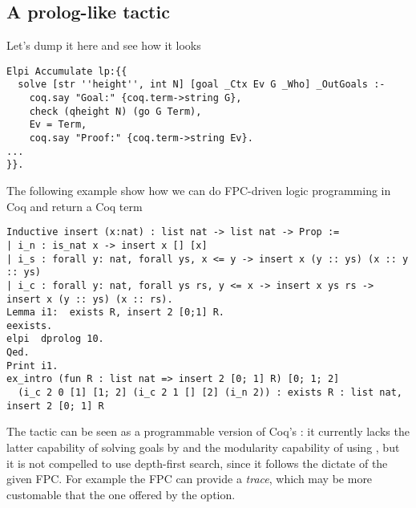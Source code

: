 

\subsection{A prolog-like tactic}

\begin{metanote}
  Let's dump it here and see how it looks
\end{metanote}

\begin{lstlisting}
Elpi Accumulate lp:{{
  solve [str ''height'', int N] [goal _Ctx Ev G _Who] _OutGoals :-
    coq.say "Goal:" {coq.term->string G},
    check (qheight N) (go G Term),
    Ev = Term,
    coq.say "Proof:" {coq.term->string Ev}.
...
}}.
\end{lstlisting}
The following example show how we can do FPC-driven logic programming in Coq and return
a Coq term
\begin{lstlisting}
Inductive insert (x:nat) : list nat -> list nat -> Prop :=
| i_n : is_nat x -> insert x [] [x]
| i_s : forall y: nat, forall ys, x <= y -> insert x (y :: ys) (x :: y :: ys)
| i_c : forall y: nat, forall ys rs, y <= x -> insert x ys rs -> insert x (y :: ys) (x :: rs).
Lemma i1:  exists R, insert 2 [0;1] R.
eexists.
elpi  dprolog 10.
Qed.
Print i1.
ex_intro (fun R : list nat => insert 2 [0; 1] R) [0; 1; 2]
  (i_c 2 0 [1] [1; 2] (i_c 2 1 [] [2] (i_n 2)) : exists R : list nat, insert 2 [0; 1] R
\end{lstlisting}

The  tactic can be seen as a programmable version of
Coq's : it currently lacks the latter capability of solving
goals by  and the modularity capability of using
, but it is not compelled to use depth-first search, since it follows the dictate of the given FPC. For example the FPC can provide a \emph{trace}, which may be more customable that the one offered by the  option.
%

